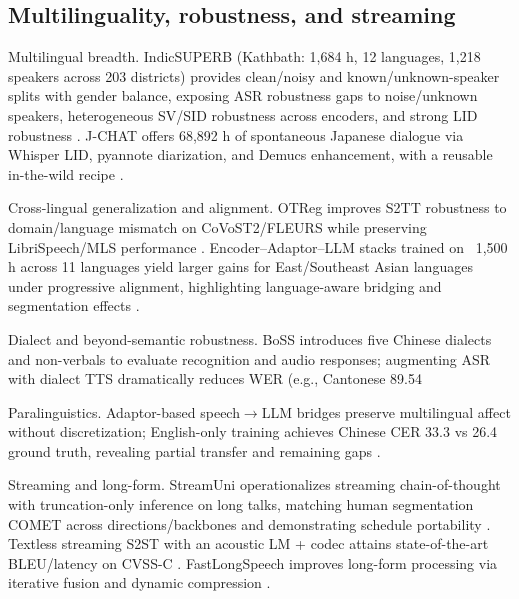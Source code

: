 \documentclass{article}
\begin{document}
\subsection{Multilinguality, robustness, and streaming} \label{subsec:multilinguality,robustness,andstreaming}

Multilingual breadth. IndicSUPERB (Kathbath: 1,684 h, 12 languages, 1,218 speakers across 203 districts) provides clean/noisy and known/unknown-speaker splits with gender balance, exposing ASR robustness gaps to noise/unknown speakers, heterogeneous SV/SID robustness across encoders, and strong LID robustness \cite{entry2025indicsuperbspeechprocessinguniversalperf}. J-CHAT offers 68,892 h of spontaneous Japanese dialogue via Whisper LID, pyannote diarization, and Demucs enhancement, with a reusable in-the-wild recipe \cite{nakata2024jchatjapaneselargescalespokendialoguecor}.

Cross-lingual generalization and alignment. OTReg improves S2TT robustness to domain/language mismatch on CoVoST2/FLEURS while preserving LibriSpeech/MLS performance \cite{xu2025optimaltransportregularizationspeechtext}. Encoder--Adaptor--LLM stacks trained on ~1,500 h across 11 languages yield larger gains for East/Southeast Asian languages under progressive alignment, highlighting language-aware bridging and segmentation effects \cite{nguyen2025qwenvsgemmaintegrationwhispercomparative}.

Dialect and beyond-semantic robustness. BoSS introduces five Chinese dialects and non-verbals to evaluate recognition and audio responses; augmenting ASR with dialect TTS dramatically reduces WER (e.g., Cantonese 89.54%

Paralinguistics. Adaptor-based speech$\rightarrow$LLM bridges preserve multilingual affect without discretization; English-only training achieves Chinese CER 33.3 vs 26.4 ground truth, revealing partial transfer and remaining gaps \cite{wang2024blspemotowardsempatheticlargespeechlangu,zhu2024generativepretrainedspeechlanguagemodele}.

Streaming and long-form. StreamUni operationalizes streaming chain-of-thought with truncation-only inference on long talks, matching human segmentation COMET across directions/backbones and demonstrating schedule portability \cite{guo2025streamuniachievingstreamingspeechtransla}. Textless streaming S2ST with an acoustic LM + codec attains state-of-the-art BLEU/latency on CVSS-C \cite{zhao2024textlessstreamingspeechtranslationsemant}. FastLongSpeech improves long-form processing via iterative fusion and dynamic compression \cite{guo2025fastlongspeechenhancinglargespeechlangua}.
\end{document}
